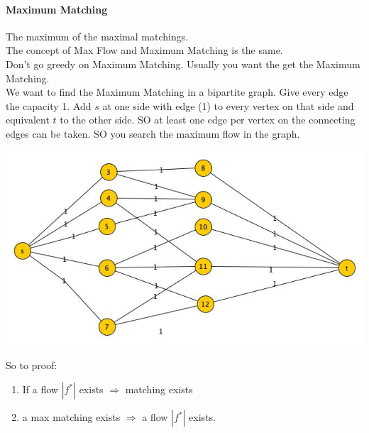 \paragraph{Maximum Matching} The maximum of the maximal matchings. \\
The concept of Max Flow and Maximum Matching is the same. \\
Don't go greedy on Maximum Matching. Usually you want the get the Maximum Matching. \\
We want to find the Maximum Matching in a bipartite graph. Give every edge the capacity 1. Add $s$ at one side with edge (1) to every vertex on that side and equivalent $t$ to the other side. SO at least one edge per vertex on the connecting edges can be taken. SO you search the maximum flow in the graph.
\begin{center}
	\includegraphics[scale=0.5]{img/graph17}
\end{center}
So to proof:
\begin{enumerate}
	\item If a flow $|f^*|$ exists $\Rightarrow$ matching exists
	\item a max matching exists $\Rightarrow$ a flow $|f^*|$ exists.
\end{enumerate}